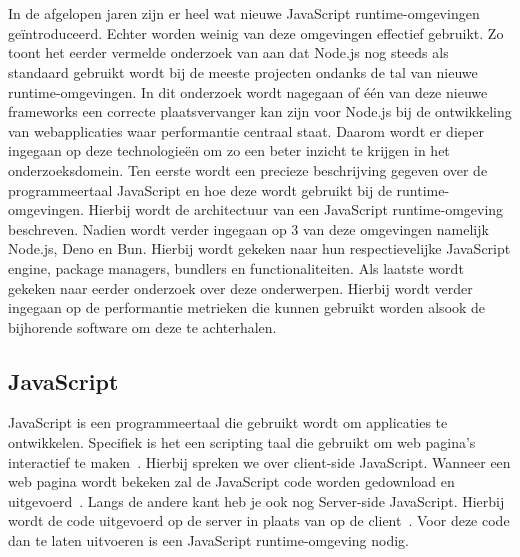 \chapter{}%
\label{ch:stand-van-zaken}




In de afgelopen jaren zijn er heel wat nieuwe JavaScript runtime-omgevingen geïntroduceerd. Echter worden weinig van deze omgevingen effectief gebruikt.
Zo toont het eerder vermelde onderzoek van \textcite{Greif2022} aan dat Node.js nog steeds als standaard gebruikt wordt bij de meeste projecten 
ondanks de tal van nieuwe runtime-omgevingen.
In dit onderzoek wordt nagegaan of één van deze nieuwe frameworks
een correcte plaatsvervanger kan zijn voor Node.js bij de ontwikkeling van webapplicaties waar performantie centraal staat.
Daarom wordt er dieper ingegaan op deze technologieën om zo een beter inzicht te krijgen in het onderzoeksdomein.
Ten eerste wordt een precieze beschrijving gegeven over de programmeertaal JavaScript en hoe deze wordt gebruikt bij de runtime-omgevingen.
Hierbij wordt de architectuur van een JavaScript runtime-omgeving beschreven.
Nadien wordt verder ingegaan op 3 van deze omgevingen namelijk Node.js, Deno en Bun. 
Hierbij wordt gekeken naar hun respectievelijke JavaScript engine, package managers, bundlers en functionaliteiten.
Als laatste wordt gekeken naar eerder onderzoek over deze onderwerpen. 
Hierbij wordt verder ingegaan op de performantie metrieken die kunnen gebruikt worden alsook de bijhorende 
software om deze te achterhalen.

\section{JavaScript}
JavaScript is een programmeertaal die gebruikt wordt om applicaties te ontwikkelen. 
Specifiek is het een scripting taal die gebruikt om web pagina's interactief te maken~\autocite{Mozilla2023}.
Hierbij spreken we over client-side JavaScript. Wanneer een web pagina wordt bekeken zal de JavaScript code worden 
gedownload en uitgevoerd~\autocite{JonathanBrownCFA2024}. Langs de andere kant heb je ook nog Server-side JavaScript. 
Hierbij wordt de code uitgevoerd op de server in plaats van op de client~\autocite{JonathanBrownCFA2024}. 
Voor deze code dan te laten uitvoeren is een JavaScript runtime-omgeving nodig. 


